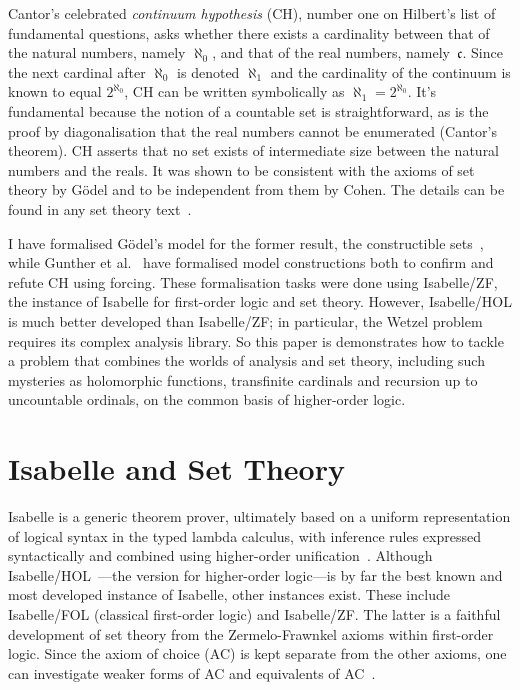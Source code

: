 \documentclass[runningheads]{llncs}
\begin{document}
Cantor's celebrated \textit{continuum hypothesis} (CH), number one on Hilbert's list of fundamental questions, asks whether there exists a cardinality between that of the natural numbers, namely $\aleph_0$, and that of the real numbers, namely~$\mathfrak{c}$.
Since the next cardinal after $\aleph_0$ is denoted $\aleph_1$ and the cardinality of the continuum is known to equal $2^{\aleph_0}$,  CH can be written symbolically as $\aleph_1 = 2^{\aleph_0}$.
It's fundamental because the notion of a countable set is straightforward, as is the proof by diagonalisation that the real numbers cannot be enumerated (Cantor's theorem).
CH asserts that no set exists of intermediate size between the natural numbers and the reals.
It was shown to be consistent with the axioms of set theory by Gödel and to be independent from them by Cohen.
The details can be found in any set theory text~\cite{kunen80}.

I have formalised Gödel's model for the former result, the constructible sets~\cite{paulson-consistency}, while
Gunther et al.\ \cite{Independence_CH-AFP} have formalised model constructions both to confirm and refute CH using forcing.
These formalisation tasks were done using Isabelle/ZF, the instance of Isabelle for first-order logic and set theory.
However, Isabelle/HOL is much better developed than Isabelle/ZF;
in particular, the Wetzel problem requires its complex analysis library. So this paper is demonstrates how to tackle a problem that combines the worlds of analysis and set theory, including such mysteries as holomorphic functions, transfinite cardinals and recursion up to uncountable ordinals, on the common basis of higher-order logic.


\section{Isabelle and Set Theory}

Isabelle is a generic theorem prover, ultimately based on a uniform representation of logical syntax in the typed lambda calculus, with inference rules expressed syntactically and combined using higher-order unification~\cite{paulson-found}. Although Isabelle/HOL~\cite{isa-tutorial}---the version for higher-order logic---is by far the best known and most developed instance of Isabelle, other instances exist. These include Isabelle/FOL (classical first-order logic) and Isabelle/ZF\@.
The latter is a faithful development of set theory from the Zermelo-Frawnkel axioms within first-order logic.
Since the axiom of choice (AC) is kept separate from the other axioms, one can investigate weaker forms of AC and equivalents of AC~\cite{paulson-gr}. 
\end{document}
